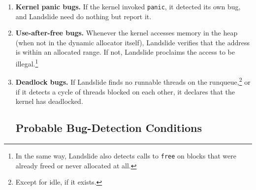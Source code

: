 \begin{enumerate}
	\item {\bf Kernel panic bugs.} If the kernel invoked \texttt{panic}, it detected its own bug, and Landslide need do nothing but report it.
	\item {\bf Use-after-free bugs.} Whenever the kernel accesses memory in the heap (when not in the dynamic allocator itself), Landslide verifies that the address is within an allocated range. If not, Landslide proclaims the access to be illegal.\footnote{In the same way, Landslide also detects calls to \texttt{free} on blocks that were already freed or never allocated at all.}
	\item {\bf Deadlock bugs.} If Landslide finds no runnable threads on the runqueue,\footnote{Except for idle, if it exists.} or if it detects a cycle of threads blocked on each other, it declares that the kernel has deadlocked.

\subsection{Probable Bug-Detection Conditions}


\end{enumerate}
